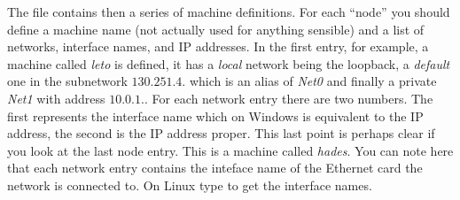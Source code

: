 The file contains then a series of machine definitions. For each ``node'' you should define a machine name (not actually used for anything sensible) and a list of networks, interface names, and IP addresses. In the first entry, for example, a machine called {\em leto} is defined, it has a {\em local} network being the loopback, a {\em default} one in the subnetwork $130.251.4.$ which is an alias of {\em Net0} and finally a private {\em Net1} with address $10.0.1.$. For each network entry there are two numbers. The first represents the interface name which on Windows is equivalent to the IP address, the second is the IP address proper.
This last point is perhaps clear if you look at the last node entry. This is a machine called {\em hades}. You can note here that each network entry contains the inteface name of the Ethernet card the network is connected to. On Linux type  to get the interface names.

